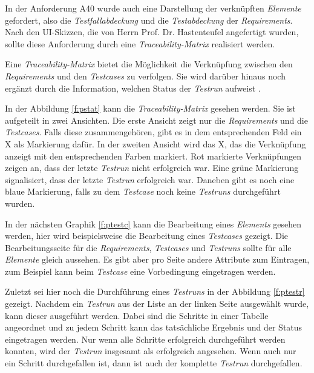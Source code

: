 \documentclass[11pt,a4paper]{report}
\begin{document}
In der Anforderung A40 wurde auch eine Darstellung der verknüpften \textit{Elemente} gefordert, also die \textit{Testfallabdeckung} und die \textit{Testabdeckung} der \textit{Requirements}. Nach den UI-Skizzen, die von Herrn Prof. Dr. Hastenteufel angefertigt wurden, sollte diese Anforderung durch eine \textit{Traceability-Matrix} realisiert werden.

Eine \textit{Traceability-Matrix} bietet die Möglichkeit die Verknüpfung zwischen den \textit{Requirements} und den \textit{Testcases} zu verfolgen. Sie wird darüber hinaus noch ergänzt durch die Information, welchen Status der \textit{Testrun} aufweist \cite{guru}.

In der Abbildung \ref{f:pstat} kann die \textit{Traceability-Matrix} gesehen werden. Sie ist aufgeteilt in zwei Ansichten. Die erste Ansicht zeigt nur die \textit{Requirements} und die \textit{Testcases}. Falls diese zusammengehören, gibt es in dem entsprechenden Feld ein X als Markierung dafür. In der zweiten Ansicht wird das X, das die Verknüpfung anzeigt mit den entsprechenden Farben markiert. Rot markierte Verknüpfungen zeigen an, dass der letzte \textit{Testrun} nicht erfolgreich war. Eine grüne Markierung signalisiert, dass der letzte \textit{Testrun} erfolgreich war. Daneben gibt es noch eine blaue Markierung, falls zu dem \textit{Testcase} noch keine \textit{Testruns} durchgeführt wurden.




In der nächsten Graphik \ref{f:ptestc} kann die Bearbeitung eines \textit{Elements} gesehen werden, hier wird beispielsweise die Bearbeitung eines \textit{Testcases} gezeigt. Die Bearbeitungsseite für die \textit{Requirements}, \textit{Testcases} und \textit{Testruns} sollte für alle \textit{Elemente} gleich aussehen. Es gibt aber pro Seite andere Attribute zum Eintragen, zum Beispiel kann beim \textit{Testcase} eine Vorbedingung eingetragen werden.


Zuletzt sei hier noch die Durchführung eines \textit{Testruns} in der Abbildung \ref{f:ptestr} gezeigt. Nachdem ein \textit{Testrun} aus der Liste an der linken Seite ausgewählt wurde, kann dieser ausgeführt werden. Dabei sind die Schritte in einer Tabelle angeordnet und zu jedem Schritt kann das tatsächliche Ergebnis und der Status eingetragen werden. Nur wenn alle Schritte erfolgreich durchgeführt werden konnten, wird der \textit{Testrun} insgesamt als erfolgreich angesehen. Wenn auch nur ein Schritt durchgefallen ist, dann ist auch der komplette \textit{Testrun} durchgefallen.
\end{document}
